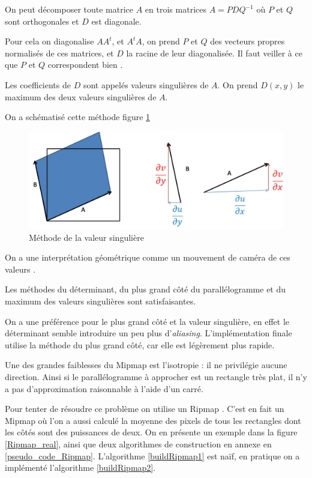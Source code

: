 On peut décomposer toute matrice $A$ en trois matrices $A = PDQ^{-1}$ où $P$ et $Q$ sont orthogonales et $D$ est diagonale.

Pour cela on diagonalise $AA^t$, et $A^tA$, on prend $P$ et $Q$ des vecteurs propres normalisés de ces matrices, et $D$ la racine de leur diagonalisée. Il faut veiller à ce que $P$ et $Q$ correspondent bien \cite{abdi2007singular}.

Les coefficients de $D$ sont appelés valeurs singulières de $A$. On prend $D(x,y)$ le maximum des deux valeurs singulières de $A$.

On a schématisé cette méthode figure \ref{methode_valeur_singuliere} 


\begin{figure}[h!]
\centering
\includegraphics[scale=0.5]{methode_valeur_singuliere.jpg}
\caption{Méthode de la valeur singulière}
\label{methode_valeur_singuliere}
\end{figure}

On a une interprétation géométrique comme un mouvement de caméra de ces valeurs \cite{morel2009asift}.


Les méthodes du déterminant, du plus grand côté du parallélogramme et du maximum des valeurs singulières sont satisfaisantes.

On a une préférence pour le plus grand côté et la valeur singulière, en effet le déterminant semble introduire un peu plus d'\emph{aliasing}. L'implémentation finale utilise la méthode du plus grand côté, car elle est légèrement plus rapide.

\label{Ripmap}
Une des grandes faiblesses du Mipmap est l'isotropie : il ne privilégie aucune direction. Ainsi si le parallélogramme à approcher est un rectangle très plat, il n'y a pas d'approximation raisonnable à l'aide d'un carré.

Pour tenter de résoudre ce problème on utilise un Ripmap \cite{akenine2008real}. C'est en fait un Mipmap où l'on a aussi calculé la moyenne des pixels de tous les rectangles dont les côtés sont des puissances de deux. On en présente un exemple dans la figure \ref{Ripmap_real}, ainsi que deux algorithmes de construction en annexe en \ref{pseudo_code_Ripmap}. L'algorithme \ref{buildRipmap1} est naïf, en pratique on a implémenté l'algorithme \ref{buildRipmap2}.

